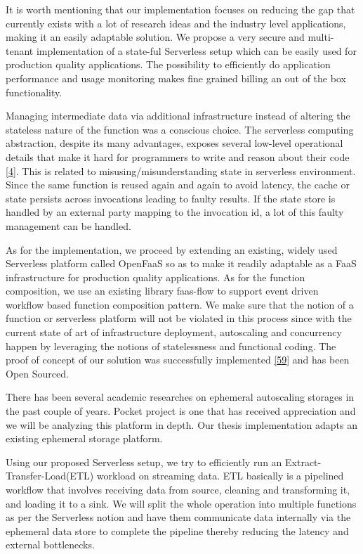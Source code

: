 \documentclass[12pt,titlepage]{article}
\begin{document}
It is worth mentioning that our implementation focuses on reducing the gap that currently
exists with a lot of research ideas and the industry level applications, making
it an easily adaptable solution. We propose a very secure and multi-tenant implementation of a
state-ful Serverless setup which can be easily used for production quality
applications. The possibility to efficiently do application performance and
usage monitoring makes fine grained billing an out of the box functionality.

Managing intermediate data via additional infrastructure instead of altering the
stateless nature of the function was a conscious choice. The serverless computing abstraction,
despite its many advantages, exposes several low-level operational details that
make it hard for programmers to write and reason about their code \hyperref[ref:4]{[4}]. This is
related to misusing/misunderstanding state in serverless environment. Since
the same function is reused again and again to avoid latency, the cache or state
persists across invocations leading to faulty results. If the state store is
handled by an external party mapping to the invocation id, a lot of this faulty
management can be handled.

As for the implementation, we proceed by extending an existing, widely used
Serverless platform called OpenFaaS so as to make it readily adaptable as a FaaS
infrastructure for production quality applications. As for the function
composition, we use an existing library faas-flow to support event driven
workflow based function composition pattern. We make sure that the notion of a
function or serverless platform will not be violated in this process since with
the current state of art of infrastructure deployment, autoscaling and
concurrency happen by leveraging the notions of statelessness and
functional coding. The proof of concept of our solution was successfully
implemented \hyperref[ref:59]{[59}] and has been Open Sourced.

There has been several academic researches on ephemeral autoscaling storages in
the past couple of years. Pocket project is one that has received appreciation
and we will be analyzing this platform in depth. Our thesis implementation
adapts an existing ephemeral storage platform.

Using our proposed Serverless setup, we try to efficiently run an
Extract-Transfer-Load(ETL) workload on streaming data. ETL basically is a
pipelined workflow that involves receiving data
from source, cleaning and transforming it, and loading it to a sink. We will
split the whole operation into multiple functions as per the Serverless notion
and have them communicate data internally via the ephemeral data store
to complete the pipeline thereby reducing the latency and external bottlenecks.
\end{document}
